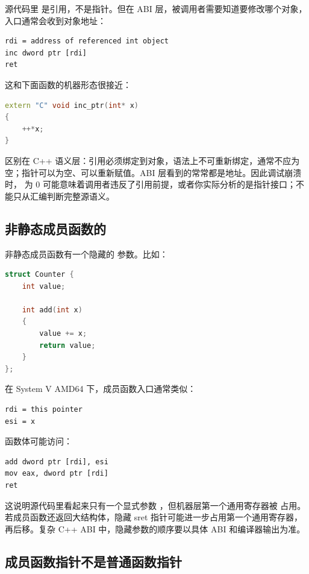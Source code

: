 源代码里  是引用，不是指针。但在 ABI 层，被调用者需要知道要修改哪个对象，入口通常会收到对象地址：

\begin{lstlisting}
rdi = address of referenced int object
inc dword ptr [rdi]
ret
\end{lstlisting}

这和下面函数的机器形态很接近：

\begin{lstlisting}[language=C++]
extern "C" void inc_ptr(int* x)
{
    ++*x;
}
\end{lstlisting}

区别在 C++ 语义层：引用必须绑定到对象，语法上不可重新绑定，通常不应为空；指针可以为空、可以重新赋值。ABI 层看到的常常都是地址。因此调试崩溃时， 为 0 可能意味着调用者违反了引用前提，或者你实际分析的是指针接口；不能只从汇编判断完整源语义。

\subsection{非静态成员函数的 }

非静态成员函数有一个隐藏的  参数。比如：

\begin{lstlisting}[language=C++]
struct Counter {
    int value;

    int add(int x)
    {
        value += x;
        return value;
    }
};
\end{lstlisting}

在 System V AMD64 下，成员函数入口通常类似：

\begin{lstlisting}
rdi = this pointer
esi = x
\end{lstlisting}

函数体可能访问：

\begin{lstlisting}
add dword ptr [rdi], esi
mov eax, dword ptr [rdi]
ret
\end{lstlisting}

这说明源代码里看起来只有一个显式参数 ，但机器层第一个通用寄存器被  占用。若成员函数还返回大结构体，隐藏 sret 指针可能进一步占用第一个通用寄存器， 再后移。复杂 C++ ABI 中，隐藏参数的顺序要以具体 ABI 和编译器输出为准。

\subsection{成员函数指针不是普通函数指针}

